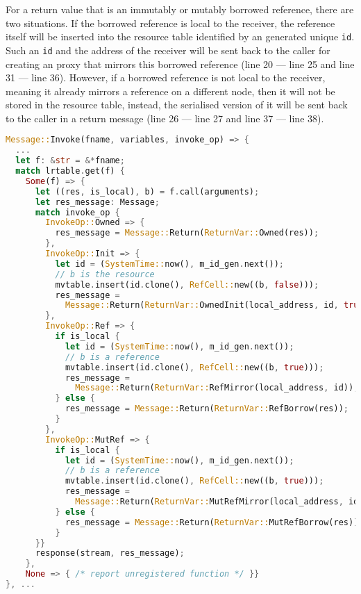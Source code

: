 For a return value that is an immutably or mutably borrowed reference, there are two situations. 
If the borrowed reference is local to the receiver, the reference itself will be inserted into the resource table identified by an generated unique \texttt{id}. Such an \texttt{id} and the address of the receiver will be sent back to the caller for creating an proxy that mirrors this borrowed reference (line 20 --- line 25 and line 31 --- line 36). 
However, if a borrowed reference is not local to the receiver, meaning it already mirrors a reference on a different node, then it will not be stored in the resource table, instead, the serialised version of it will be sent back to the caller in a return message (line 26 --- line 27 and line 37 --- line 38).
\begin{lstlisting}[language=Rust, style=boxed, basicstyle=\footnotesize\ttfamily, caption={Executing an invocation and returning the result}, label=chap3:impl:lst:exec-return]
Message::Invoke(fname, variables, invoke_op) => {
  ...
  let f: &str = &*fname; 
  match lrtable.get(f) {
    Some(f) => {
      let ((res, is_local), b) = f.call(arguments);
      let res_message: Message;
      match invoke_op {
        InvokeOp::Owned => { 
          res_message = Message::Return(ReturnVar::Owned(res)); 
        },
        InvokeOp::Init => {
          let id = (SystemTime::now(), m_id_gen.next());
          // b is the resource
          mvtable.insert(id.clone(), RefCell::new((b, false)));
          res_message = 
            Message::Return(ReturnVar::OwnedInit(local_address, id, true));
        },
        InvokeOp::Ref => {
          if is_local {
            let id = (SystemTime::now(), m_id_gen.next());
            // b is a reference
            mvtable.insert(id.clone(), RefCell::new((b, true)));
            res_message =
              Message::Return(ReturnVar::RefMirror(local_address, id));
          } else { 
            res_message = Message::Return(ReturnVar::RefBorrow(res)); 
          }
        },
        InvokeOp::MutRef => {
          if is_local {
            let id = (SystemTime::now(), m_id_gen.next());
            // b is a reference
            mvtable.insert(id.clone(), RefCell::new((b, true)));
            res_message =
              Message::Return(ReturnVar::MutRefMirror(local_address, id));
          } else { 
            res_message = Message::Return(ReturnVar::MutRefBorrow(res)); 
          }
      }}
      response(stream, res_message);
    },
    None => { /* report unregistered function */ }}
}, ...
\end{lstlisting}

